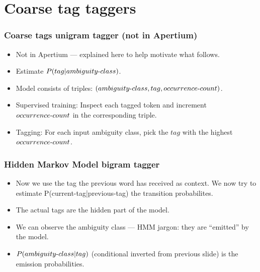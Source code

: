 \documentclass{beamer}
\begin{document}
\section{Coarse tag taggers}
\begin{frame}
\frametitle{Coarse tags unigram tagger (not in Apertium)}
\begin{itemize}

  \item Not in Apertium --- explained here to help motivate what follows.

  \item Estimate $P(tag|ambiguity\hbox{-}class)$.

  \item Model consists of triples:
    $(ambiguity\hbox{-}class,\allowbreak tag,\allowbreak
    occurrence\hbox{-}count)$.

  \item Supervised training: Inspect each tagged token and increment
    $occurrence\hbox{-}count$ in the corresponding triple.

  \item Tagging: For each input ambiguity class, pick the $tag$
    with the highest $occurrence\hbox{-}count$.

\end{itemize}
\end{frame}

\begin{frame}
\frametitle{Hidden Markov Model bigram tagger}
\begin{itemize}

  \item Now we use the tag the previous word has received as context. We
    now try to estimate
    P(current\hbox{-}tag|previous\hbox{-}tag) the
    transition probabilites.

  \item The actual tags are the hidden part of the model.

  \item We can observe the ambiguity class --- HMM jargon: they are ``emitted''
    by the model.

  \item $P(ambiguity\hbox{-}class|tag)$ (conditional inverted from previous slide)
    is the emission probabilities.

\end{itemize}
\end{frame}
\end{document}
